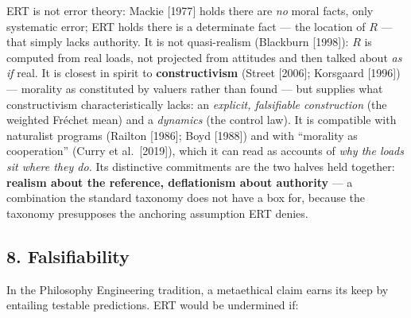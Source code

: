 \documentclass[
]{article}
\begin{document}
ERT is not error theory: Mackie {[}1977{]} holds there are \emph{no}
moral facts, only systematic error; ERT holds there is a determinate
fact --- the location of \(R\) --- that simply lacks authority. It is
not quasi-realism (Blackburn {[}1998{]}): \(R\) is computed from real
loads, not projected from attitudes and then talked about \emph{as if}
real. It is closest in spirit to \textbf{constructivism} (Street
{[}2006{]}; Korsgaard {[}1996{]}) --- morality as constituted by valuers
rather than found --- but supplies what constructivism
characteristically lacks: an \emph{explicit, falsifiable construction}
(the weighted Fréchet mean) and a \emph{dynamics} (the control law). It
is compatible with naturalist programs (Railton {[}1986{]}; Boyd
{[}1988{]}) and with ``morality as cooperation'' (Curry et
al.~{[}2019{]}), which it can read as accounts of \emph{why the loads
sit where they do.} Its distinctive commitments are the two halves held
together: \textbf{realism about the reference, deflationism about
authority} --- a combination the standard taxonomy does not have a box
for, because the taxonomy presupposes the anchoring assumption ERT
denies.

\subsection{8. Falsifiability}\label{falsifiability}

In the Philosophy Engineering tradition, a metaethical claim earns its
keep by entailing testable predictions. ERT would be undermined if:
\end{document}
